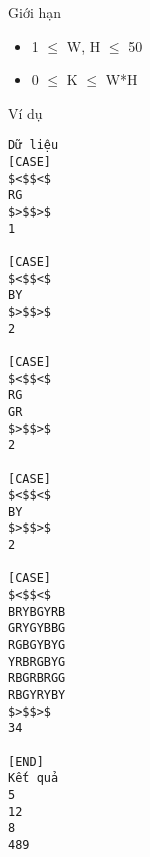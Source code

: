 Giới hạn
\begin{itemize}
	\item     1  $\le$  W, H  $\le$  50   
	\item     0  $\le$  K  $\le$  W*H   
\end{itemize}
Ví dụ
\begin{verbatim}
Dữ liệu
[CASE]
$<$$<$
RG
$>$$>$
1

[CASE]
$<$$<$
BY
$>$$>$
2

[CASE]
$<$$<$
RG
GR
$>$$>$
2

[CASE]
$<$$<$
BY
$>$$>$
2

[CASE]
$<$$<$ 	
BRYBGYRB
GRYGYBBG
RGBGYBYG
YRBRGBYG
RBGRBRGG
RBGYRYBY
$>$$>$
34

[END]
Kết quả
5
12
8
489
\end{verbatim}